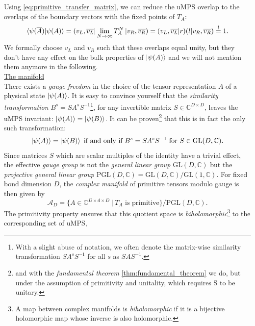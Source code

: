 \noindent Using \eqref{eq:primitive_transfer_matrix}, we can reduce the uMPS overlap to the overlaps of the boundary vectors with the fixed points of $T_A$:
\begin{equation}
	\langle \psi (\overline{A}) \vert \psi (A) \rangle = \left( v_L, \overline{v_L} \right| \lim_{N \to \infty} T_A^{N} \left| v_R, \overline{v_R} \right) = ( v_L, \overline{v_L} \vert r ) ( l \vert v_R, \overline{v_R} ) \overset{!}{=} 1.
\end{equation}
We formally choose $v_L$ and $v_R$ such that these overlaps equal unity, but they don't have any effect on the bulk properties of $\ket{\psi (A)}$ and we will not mention them anymore in the following. \\[1em]

\noindent \underline{The manifold} \\[0.5em]
\noindent There exists a \textit{gauge freedom} in the choice of the tensor representation $A$ of a physical state $\ket{\psi (A)}$. It is easy to convince yourself that the \textit{similarity transformation} $B^s = S A^s S^{-1}$\footnote{With a slight abuse of notation, we often denote the matrix-wise similarity transformation $S A^s S^{-1}$ for all $s$ as $S A S^{-1}$.}, for any invertible matrix $S \in \mathbb{C}^{D \times D}$, leaves the uMPS invariant: $\ket{\psi (A)} = \ket{\psi (B)}$. It can be proven\footnote{and with the \textit{fundamental theorem} \ref{thm:fundamental_theorem} we do, but under the assumption of primitivity and unitality, which requires S to be unitary.} that this is in fact the only such transformation:
\begin{equation} \label{eq:umps_gauge}
	\ket{\psi (A)} = \ket{\psi (B)} \text{ if and only if } B^s = S A^s S^{-1} \text{ for } S \in \mathrm{GL}(D, \mathbb{C}).
\end{equation}
Since matrices $S$ which are scalar multiples of the identity have a trivial effect, the effective \textit{gauge group} is not the \textit{general linear group} $\mathrm{GL}(D, \mathbb{C})$ but the \textit{projective general linear group} $\mathrm{PGL}(D, \mathbb{C}) = \mathrm{GL}(D, \mathbb{C}) / \mathrm{GL}(1, \mathbb{C})$. For fixed bond dimension $D$, the \textit{complex manifold} of primitive tensors modulo gauge is then given by
\begin{equation}
	\mathcal{A}_D = \{A \in \mathbb{C}^{D \times d \times D} \: \vert \: T_A \text{ is primitive} \} / \mathrm{PGL}(D, \mathbb{C}). 
\end{equation}
The primitivity property ensures that this quotient space is \textit{biholomorphic}\footnote{A map between complex manifolds is \textit{biholomorphic} if it is a bijective holomorphic map whose inverse is also holomorphic.} to the corresponding set of uMPS,
